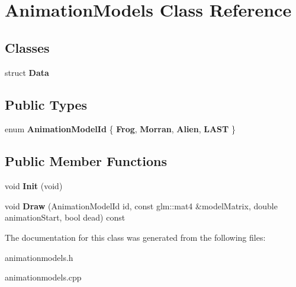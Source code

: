 \hypertarget{classAnimationModels}{\section{\-Animation\-Models \-Class \-Reference}
\label{classAnimationModels}
}
\subsection*{\-Classes}
\begin{DoxyCompactItemize}
\item 
struct {\bfseries \-Data}
\end{DoxyCompactItemize}
\subsection*{\-Public \-Types}
\begin{DoxyCompactItemize}
\item 
enum {\bfseries \-Animation\-Model\-Id} \{ {\bfseries \-Frog}, 
{\bfseries \-Morran}, 
{\bfseries \-Alien}, 
{\bfseries \-L\-A\-S\-T}
 \}
\end{DoxyCompactItemize}
\subsection*{\-Public \-Member \-Functions}
\begin{DoxyCompactItemize}
\item 
\hypertarget{classAnimationModels_a6389af3ee99876374e7a7608b9f2babf}{void {\bfseries \-Init} (void)}\label{classAnimationModels_a6389af3ee99876374e7a7608b9f2babf}

\item 
\hypertarget{classAnimationModels_a66f91816b56d6198aa363896b84806fa}{void {\bfseries \-Draw} (\-Animation\-Model\-Id id, const glm\-::mat4 \&model\-Matrix, double animation\-Start, bool dead) const }\label{classAnimationModels_a66f91816b56d6198aa363896b84806fa}

\end{DoxyCompactItemize}


\-The documentation for this class was generated from the following files\-:\begin{DoxyCompactItemize}
\item 
animationmodels.\-h\item 
animationmodels.\-cpp\end{DoxyCompactItemize}
